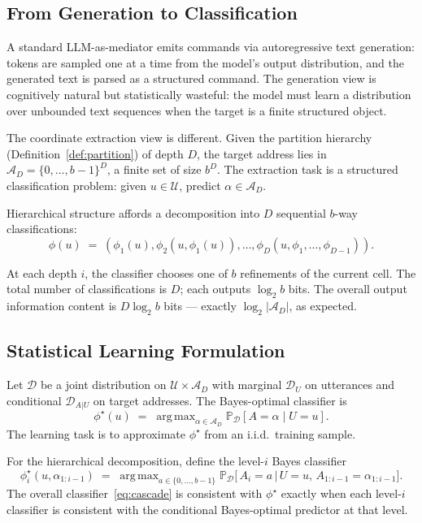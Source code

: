 \documentclass[11pt,twocolumn,a4paper]{article}
\theoremstyle{definition}
\theoremstyle{remark}
\DeclareMathOperator*{\argmax}{arg\,max}
\renewcommand{\Pr}{\mathbb{P}}
\newcommand{\Uc}{\mathcal{U}}
\begin{document}
\subsection{From Generation to Classification}

A standard LLM-as-mediator emits commands via autoregressive text generation: tokens are sampled one at a time from the model's output distribution, and the generated text is parsed as a structured command. The generation view is cognitively natural but statistically wasteful: the model must learn a distribution over unbounded text sequences when the target is a finite structured object.

The coordinate extraction view is different. Given the partition hierarchy (Definition~\ref{def:partition}) of depth $D$, the target address lies in $\mathcal{A}_D = \{0,\ldots,b-1\}^D$, a finite set of size $b^D$. The extraction task is a structured classification problem: given $u \in \Uc$, predict $\alpha \in \mathcal{A}_D$.

Hierarchical structure affords a decomposition into $D$ sequential $b$-way classifications:
\begin{equation}
\label{eq:cascade}
\phi(u) \;=\; (\phi_1(u), \phi_2(u, \phi_1(u)), \ldots, \phi_D(u, \phi_1, \ldots, \phi_{D-1})).
\end{equation}

At each depth $i$, the classifier chooses one of $b$ refinements of the current cell. The total number of classifications is $D$; each outputs $\log_2 b$ bits. The overall output information content is $D \log_2 b$ bits --- exactly $\log_2 |\mathcal{A}_D|$, as expected.

\subsection{Statistical Learning Formulation}

Let $\mathcal{D}$ be a joint distribution on $\Uc \times \mathcal{A}_D$ with marginal $\mathcal{D}_U$ on utterances and conditional $\mathcal{D}_{A|U}$ on target addresses. The Bayes-optimal classifier is
\[
\phi^\star(u) \;=\; \argmax_{\alpha \in \mathcal{A}_D} \Pr_{\mathcal{D}}[A = \alpha \mid U = u].
\]
The learning task is to approximate $\phi^\star$ from an i.i.d.\ training sample.

For the hierarchical decomposition, define the level-$i$ Bayes classifier
\[
\phi_i^\star(u, \alpha_{1:i-1}) \;=\; \argmax_{a \in \{0,\ldots,b-1\}} \Pr_{\mathcal{D}}\bigl[\, A_i = a \,\big|\, U = u,\, A_{1:i-1} = \alpha_{1:i-1}\bigr].
\]
The overall classifier~\eqref{eq:cascade} is consistent with $\phi^\star$ exactly when each level-$i$ classifier is consistent with the conditional Bayes-optimal predictor at that level.
\end{document}
